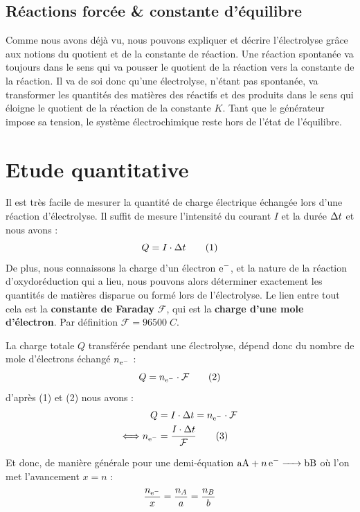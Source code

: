 \documentclass[11pt,a4paper]{article}
\begin{document}
\subsection{Réactions forcée \& constante d'équilibre}

Comme nous avons déjà vu, nous pouvons expliquer et décrire l'électrolyse grâce aux notions du quotient et de la constante de réaction. Une réaction spontanée va toujours dans le sens qui va pousser le quotient de la réaction vers la constante de la réaction. Il va de soi donc qu'une électrolyse, n'étant pas spontanée, va transformer les quantités des matières des réactifs et des produits dans le sens qui éloigne le quotient de la réaction de la constante $K$. Tant que le générateur impose sa tension, le système électrochimique reste hors de l'état de l'équilibre. 


\section{Etude quantitative}

Il est très facile de mesurer la quantité de charge électrique échangée lors d'une réaction d'électrolyse. Il suffit de mesure l'intensité du courant $I$ et la durée $\Delta t$ et nous avons : 
\[Q=I\cdot \Delta t \tag{1}\]
De plus, nous connaissons la charge d'un électron $\ce{e-}$, et la nature de la réaction d'oxydoréduction qui a lieu, nous pouvons alors déterminer exactement les quantités de matières disparue ou formé lors de l'électrolyse. Le lien entre tout cela est la \textbf{constante de Faraday} $\mathcal{F}$, qui est la \textbf{charge d'une mole d'électron}. Par définition $\mathcal{F} = 96500\;C$. 

La charge totale $Q$ transférée pendant une électrolyse, dépend donc du nombre de mole d'électrons échangé $n_{\ce{e-}}$ : 
\[ Q = n_{\ce{e-}}\cdot\mathcal{F} \tag{2}
\]
d'après (1) et (2) nous avons : 
\begin{align*}
    Q &= I\cdot \Dt = n_{\ce{e-}}\cdot\mathcal{F} \\
    \Longleftrightarrow n_{\ce{e-}} &= \dfrac{I\cdot\Dt}{\mathcal{F}} \tag{3}
\end{align*}

Et donc, de manière générale pour une demi-équation $\ce{aA + n e- -> bB }$ où l'on met l'avancement $x = n$ :
\[ \dfrac{n_{\ce{e-}}}{x} = \dfrac{n_A}{a} = \dfrac{n_B}{b}
\]
\end{document}

